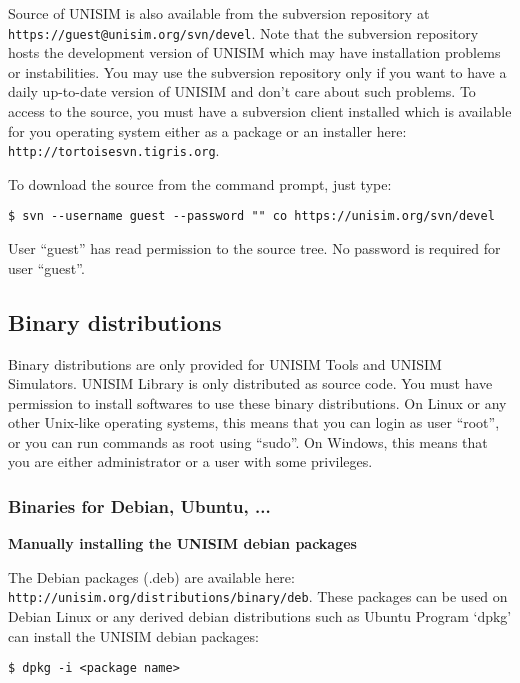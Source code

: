 Source of UNISIM is also available from the subversion repository at \texttt{https://guest@unisim.org/svn/devel}.
Note that the subversion repository hosts the development version of UNISIM which may have installation problems or instabilities.
You may use the subversion repository only if you want to have a daily up-to-date version of UNISIM and don’t care about such problems.
To access to the source, you must have a subversion client installed which is available for you operating system either as a package or an installer here: \texttt{http://tortoisesvn.tigris.org}.

To download the source from the command prompt, just type:

\begin{verbatim}
$ svn --username guest --password "" co https://unisim.org/svn/devel
\end{verbatim}

User “guest” has read permission to the source tree. No password is required for user “guest”.

\subsection{Binary distributions}

Binary distributions are only provided for UNISIM Tools and UNISIM Simulators. UNISIM Library is only distributed as source code.
You must have permission to install softwares to use these binary distributions.
On Linux or any other Unix-like operating systems, this means that you can login as user “root”, or you can run commands as root using “sudo”.
On Windows, this means that you are either administrator or a user with some privileges.

\subsubsection{Binaries for Debian, Ubuntu, ...}

\noindent \textbf{Manually installing the UNISIM debian packages}

The Debian packages (.deb) are available here: \texttt{http://unisim.org/distributions/binary/deb}.
These packages can be used on Debian Linux or any derived debian distributions such as Ubuntu
Program ‘dpkg’ can install the UNISIM debian packages:

\begin{verbatim}
$ dpkg -i <package name>
\end{verbatim}

